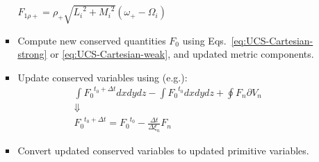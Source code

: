 \begin{itemize}
\begin{itemize}
\begin{itemize}
        ${F_{1\rho  + }} = {\rho _ + }\sqrt {{L_i}^2 + {M_i}^2} \left( {{\omega _ + } - {\Omega _i}} \right)$
      \item Compute new conserved quantities $F_0$ using Eqs.~\ref{eq:UCS-Cartesian-strong} or \ref{eq:UCS-Cartesian-weak}, and updated metric components.
      \item Update conserved variables using (e.g.):
        \[\begin{array}{c}
          \int {{F_0}^{{t_0} + \Delta t}dxdydz - } \int {{F_0}^{{t_0}}dxdydz}  + \oint {{F_n}\partial {V_n}} \\
          \Downarrow \\
          {F_0}^{{t_0} + \Delta t} = {F_0}^{{t_0}} - \frac{{\Delta t}}{{\Delta {\xi _n}}}{F_n}
        \end{array}\]
      \item Convert updated conserved variables to updated primitive variables.
      \end{itemize}
    \end{itemize}
  \end{itemize}
